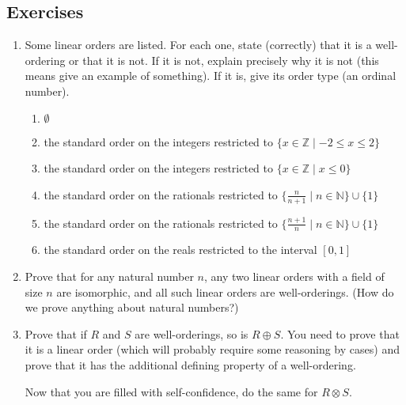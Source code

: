 \documentclass[12pt]{book}
\begin{document}
\newpage

\subsection{Exercises}

\begin{enumerate}

\item  
Some linear orders are listed.  For each one, state (correctly) that
it is a well-ordering or that it is not.  If it is not, explain
precisely why it is not (this means give an example of something).  If
it is, give its order type (an ordinal number).

\begin{enumerate}

\item $\emptyset$

\item the standard order on the integers restricted to $\{x \in {\mathbb Z}\mid -2 \leq x \leq 2\}$

\item the standard order on the integers restricted to $\{x \in {\mathbb Z}\mid x\leq 0\}$

\item the standard order on the rationals restricted to $\{\frac{n}{n+1} \mid n \in{\mathbb N}\} \cup \{1\}$

\item the standard order on the rationals restricted to $\{\frac{n+1}{n} \mid n \in{\mathbb N}\} \cup \{1\}$

\item the standard order on the reals restricted to the interval $[0,1]$

\end{enumerate}

\item 
Prove that for any natural number $n$, any two linear orders with a
field of size $n$ are isomorphic, and all such linear orders are
well-orderings.  (How do we prove anything about natural numbers?)

\item
Prove that if $R$ and $S$ are well-orderings, so is $R \oplus S$.  You
need to prove that it is a linear order (which will probably require
some reasoning by cases) and prove that it has the additional defining
property of a well-ordering.

Now that you are filled with self-confidence, do the same for $R \otimes S$.


\end{enumerate}
\end{document}
